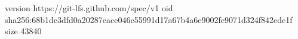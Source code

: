 version https://git-lfs.github.com/spec/v1
oid sha256:68b1dc3dfd0a20287eace046c55991d17a67b4a6e9002fe9071d324f842ede1f
size 43840
